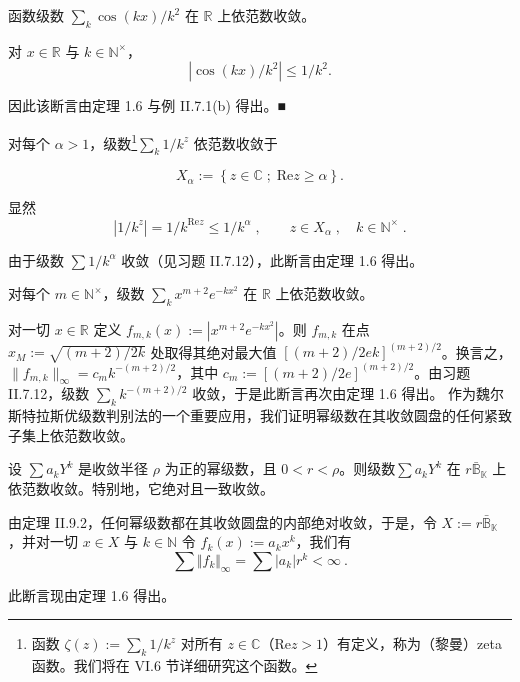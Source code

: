 \begin{example}

\begin{items}
\item

函数级数 $\sum_k \cos(kx)/k^2$ 在 $\mathbb{R}$ 上依范数收敛。

\proofhead
对 $ x \in \mathbb{R} $ 与 $ k \in \mathbb{N}^{\times} $，
\[
|\cos(kx)/k^{2}|\leq1/k^{2}.
\]

因此该断言由定理 1.6 与例 II.7.1(b) 得出。■

\item

对每个 $ \alpha > 1 $，级数\footnote{函数 $ \zeta(z) := \sum_k 1/k^z $ 对所有 $ z \in \mathbb{C} $（$ \mathrm{Re} z > 1 $）有定义，称为（黎曼）zeta 函数。我们将在 VI.6 节详细研究这个函数。}$\sum_{k} 1/k^{z}$ 依范数收敛于

\[
X_{\alpha}:=\left\{z\in\mathbb{C}\;;\;\mathrm{R e}z\geq\alpha\right\}.
\]

\proofhead
显然
\[
|1/k^{z}|=1/k^{\mathrm{R e}z}\leq1/k^{\alpha}\;,\qquad z\in X_{\alpha}\;,\quad k\in\mathbb{N}^{\times}\;.
\]

由于级数 $\sum 1/k^\alpha$ 收敛（见习题 II.7.12），此断言由定理 1.6 得出。

\item

对每个 $ m \in \mathbb{N}^\times $，级数 $\sum_k x^{m+2} e^{-kx^2}$ 在 $\mathbb{R}$ 上依范数收敛。

\proofhead
对一切 $ x \in \mathbb{R} $ 定义 $ f_{m,k}(x) := |x^{m+2}e^{-kx^2}| $。则 $ f_{m,k} $ 在点 $ x_M := \sqrt{(m+2)/2k} $ 处取得其绝对最大值 $ [(m+2)/2ek]^{(m+2)/2} $。换言之，$ \|f_{m,k}\|_{\infty} = c_m k^{-(m+2)/2} $，其中 $ c_m := [(m+2)/2e]^{(m+2)/2} $。由习题 II.7.12，级数 $ \sum_k k^{-(m+2)/2} $ 收敛，于是此断言再次由定理 1.6 得出。
作为魏尔斯特拉斯优级数判别法的一个重要应用，我们证明幂级数在其收敛圆盘的任何紧致子集上依范数收敛。
\end{items}

\end{example}

\begin{theorem}

设 $ \sum a_k Y^k $ 是收敛半径 $ \rho $ 为正的幂级数，且 $ 0 < r < \rho $。则级数$\sum a_k Y^k$ 在 $ r\bar{\mathbb{B}}_{\mathbb{K}} $ 上依范数收敛。特别地，它绝对且一致收敛。

\proofhead
由定理 II.9.2，任何幂级数都在其收敛圆盘的内部绝对收敛，于是，令 $ X := r\bar{\mathbb{B}}_{\mathbb{K}} $，并对一切 $ x \in X $ 与 $ k \in \mathbb{N} $ 令 $ f_k(x) := a_k x^k $，我们有
\[
\sum\Vert f_{k}\Vert_{\infty}=\sum|a_{k}|r^{k}<\infty~.
\]

此断言现由定理 1.6 得出。

\end{theorem}

